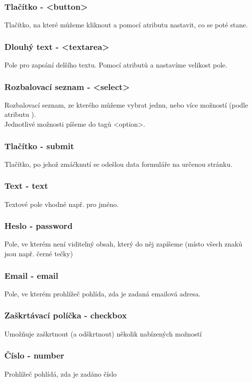 \subsubsection{Tlačítko - <button>}
Tlačítko, na které můžeme kliknout a pomocí atributu  nastavit, co se poté stane.

\subsubsection{Dlouhý text - <textarea>}
Pole pro zapsání delšího textu. Pomocí atributů  a  nastavíme velikost pole.

\subsubsection{Rozbalovací seznam - <select>}
Rozbalovací seznam, ze kterého můžeme vybrat jednu, nebo více možností (podle atributu ).\\
Jednotlivé možnosti píšeme do tagů <option>.

\subsubsection{Tlačítko - submit}
Tlačítko, po jehož zmáčknutí se odešlou data formuláře na určenou stránku.
\subsubsection{Text - text}
Textové pole vhodné např. pro jméno.
\subsubsection{Heslo - password}
Pole, ve kterém není viditelný obsah, který do něj zapíšeme (místo všech znaků jsou např. černé tečky)
\subsubsection{Email - email}
Pole, ve kterém prohlížeč pohlída, zda je zadaná emailová adresa.
\subsubsection{Zaškrtávací políčka - checkbox}
Umožňuje zaškrtnout (a odškrtnout) několik nabízených možností
\subsubsection{Číslo - number}
Prohlížeč pohlídá, zda je zadáno číslo
